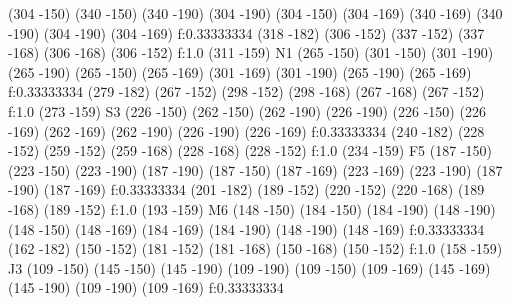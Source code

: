{
\move (304 -150)
\lvec (340 -150)
\lvec (340 -190)
\lvec (304 -190)
\lvec (304 -150)
\move (304 -169)
\lvec (340 -169)
\lvec (340 -190)
\lvec (304 -190)
\lvec (304 -169)
\lfill f:0.33333334
\htext (318 -182) {\matrixfontselect \color{white}{5}}
\move (306 -152)
\lvec (337 -152)
\lvec (337 -168)
\lvec (306 -168)
\lvec (306 -152)
\lfill f:1.0
\htext (311 -159) {\matrixfontselect N1}
\move (265 -150)
\lvec (301 -150)
\lvec (301 -190)
\lvec (265 -190)
\lvec (265 -150)
\move (265 -169)
\lvec (301 -169)
\lvec (301 -190)
\lvec (265 -190)
\lvec (265 -169)
\lfill f:0.33333334
\htext (279 -182) {\matrixfontselect \color{white}{4}}
\move (267 -152)
\lvec (298 -152)
\lvec (298 -168)
\lvec (267 -168)
\lvec (267 -152)
\lfill f:1.0
\htext (273 -159) {\matrixfontselect S3}
\move (226 -150)
\lvec (262 -150)
\lvec (262 -190)
\lvec (226 -190)
\lvec (226 -150)
\move (226 -169)
\lvec (262 -169)
\lvec (262 -190)
\lvec (226 -190)
\lvec (226 -169)
\lfill f:0.33333334
\htext (240 -182) {\matrixfontselect \color{white}{3}}
\move (228 -152)
\lvec (259 -152)
\lvec (259 -168)
\lvec (228 -168)
\lvec (228 -152)
\lfill f:1.0
\htext (234 -159) {\matrixfontselect F5}
\move (187 -150)
\lvec (223 -150)
\lvec (223 -190)
\lvec (187 -190)
\lvec (187 -150)
\move (187 -169)
\lvec (223 -169)
\lvec (223 -190)
\lvec (187 -190)
\lvec (187 -169)
\lfill f:0.33333334
\htext (201 -182) {\matrixfontselect \color{white}{2}}
\move (189 -152)
\lvec (220 -152)
\lvec (220 -168)
\lvec (189 -168)
\lvec (189 -152)
\lfill f:1.0
\htext (193 -159) {\matrixfontselect M6}
\move (148 -150)
\lvec (184 -150)
\lvec (184 -190)
\lvec (148 -190)
\lvec (148 -150)
\move (148 -169)
\lvec (184 -169)
\lvec (184 -190)
\lvec (148 -190)
\lvec (148 -169)
\lfill f:0.33333334
\htext (162 -182) {\matrixfontselect \color{white}{1}}
\move (150 -152)
\lvec (181 -152)
\lvec (181 -168)
\lvec (150 -168)
\lvec (150 -152)
\lfill f:1.0
\htext (158 -159) {\matrixfontselect J3}
\move (109 -150)
\lvec (145 -150)
\lvec (145 -190)
\lvec (109 -190)
\lvec (109 -150)
\move (109 -169)
\lvec (145 -169)
\lvec (145 -190)
\lvec (109 -190)
\lvec (109 -169)
\lfill f:0.33333334
}
